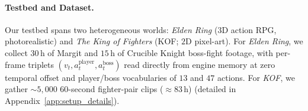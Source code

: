 \paragraph{Testbed and Dataset.}
Our testbed spans two heterogeneous worlds: \textit{Elden Ring} 
($3$D action RPG, photorealistic) and \textit{The King of Fighters} 
(KOF; $2$D pixel-art). For \textit{Elden Ring}, we collect $30$\,h of Margit and $15$\,h 
of Crucible Knight boss-fight footage, 
with per-frame triplets $(v_t, a_t^{\text{player}}, a_t^{\text{boss}})$ read directly
from engine memory at zero temporal offset and 
player/boss vocabularies of $13$ and $47$ actions. 
For \textit{KOF}, we gather ${\sim}5{,}000$ $60$-second fighter-pair clips 
(${\approx}83$\,h)
(detailed in Appendix~\ref{app:setup_details}).

